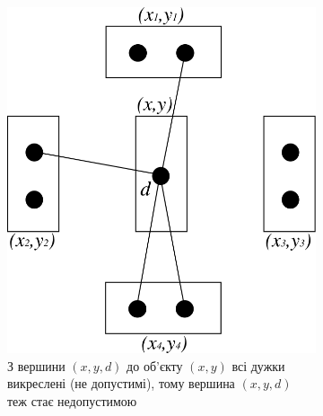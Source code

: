 \begin{figure}[h]
\centering
    \begin{subfigure}[t]{0.45\textwidth}
        \centering
        \includegraphics[width=\textwidth]{images/crossing_vertex}
        \caption{З вершини $\left(x, y, d \right)$ до об'єкту
                 $\left(x, y \right)$ всі дужки викреслені (не допустимі),
                 тому вершина $\left(x, y, d \right)$ теж стає недопустимою}
        \label{fig:crossing:vertex:yes}
    \end{subfigure}
    \hfill
    \begin{subfigure}[t]{0.45\textwidth}
        \centering

\end{subfigure}
\end{figure}

